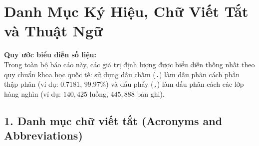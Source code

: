 
\chapter*{Danh Mục Ký Hiệu, Chữ Viết Tắt và Thuật Ngữ}

\noindent\textbf{Quy ước biểu diễn số liệu:}\\
Trong toàn bộ báo cáo này, các giá trị định lượng được biểu diễn thống nhất theo quy chuẩn khoa học quốc tế: sử dụng dấu chấm (\texttt{.}) làm dấu phân cách phần thập phân (ví dụ: $0.7181$, $99.97\%$) và dấu phẩy (\texttt{,}) làm dấu phân cách các lớp hàng nghìn (ví dụ: $140,425$ luồng, $445,888$ bản ghi).

\vspace{0.3cm}

\section*{1. Danh mục chữ viết tắt (Acronyms and Abbreviations)}

